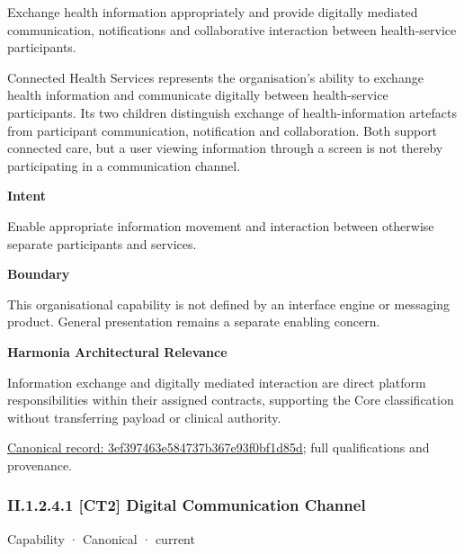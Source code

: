 Exchange health information appropriately and provide digitally mediated communication, notifications and collaborative interaction between health-service participants.



Connected Health Services represents the organisation's ability to exchange health information and communicate digitally between health-service participants. Its two children distinguish exchange of health-information artefacts from participant communication, notification and collaboration. Both support connected care, but a user viewing information through a screen is not thereby participating in a communication channel.



\textbf{Intent}



Enable appropriate information movement and interaction between otherwise separate participants and services.



\textbf{Boundary}



This organisational capability is not defined by an interface engine or messaging product. General presentation remains a separate enabling concern.



\textbf{Harmonia Architectural Relevance}



Information exchange and digitally mediated interaction are direct platform responsibilities within their assigned contracts, supporting the Core classification without transferring payload or clinical authority.


{\footnotesize \href{../../../../continuum/strategy/capability/3ef397463e584737b367e93f0bf1d85d.md}{Canonical record: 3ef397463e584737b367e93f0bf1d85d}; full qualifications and provenance.}\par
\subsubsection*{II.1.2.4.1 [CT2] Digital Communication Channel}
\label{navigation:II.1.2.4.1}

\label{element:f5defe141228490598115fe41db89bd7}
{\small Capability · Canonical · current}\par

